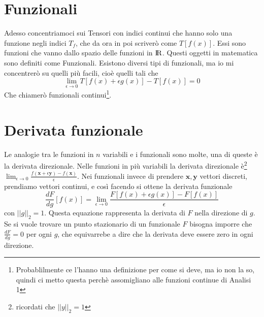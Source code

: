\documentclass[11pt,a4paper]{article}
\theoremstyle{definition}
\theoremstyle{plain}
\theoremstyle{plain}
\begin{document}
	\section{Funzionali}
		Adesso concentriamoci sui Tensori con indici continui che hanno solo una funzione negli indici $T_f$, che da ora in poi scriverò come $T[f(x)]$. Essi sono funzioni che vanno dallo spazio delle funzioni in $\rm I\!R$. Questi oggetti in matematica sono definiti come Funzionali.\newline
		Esistono diversi tipi di funzionali, ma io mi concentrerò su quelli più facili, cioè quelli tali che
		\begin{equation}
			\lim_{\epsilon 	\to 0}T[f(x)+\epsilon g(x)]-T[f(x)]=0
		\end{equation}
		Che chiamerò funzionali continui\footnote{Probablilmente ce l'hanno una definizione per come si deve, ma io non la so, quindi ci metto questa perchè assomigliano alle funzioni continue di Analisi 1}.
	\section{Derivata funzionale}
		Le analogie tra le funzioni in $n$ variabili e i funzionali sono molte, una di queste è la derivata direzionale.\newline
		Nelle funzioni in più variabili la derivata direzionale è\footnote{ricordati che $||y||_2=1$} $\lim_{\epsilon \to 0}\frac{f(\mathbf{x}+\epsilon\mathbf{y})-f(\mathbf{x})}{\epsilon}$. Nei funzionali invece di prendere $\mathbf{x},\mathbf{y}$ vettori discreti, prendiamo vettori continui, e così facendo si ottene la derivata funzionale
		\begin{equation}
			\frac{dF}{dg}[f(x)]=\lim_{\epsilon \to 0}\frac{F[f(x)+\epsilon g(x)]-F[f(x)]}{\epsilon}
		\end{equation}
		con $||g||_2=1$. Questa equazione rappresenta la derivata di $F$ nella direzione di $g$.\newline
		Se si vuole trovare un punto stazionario di un funzionale $F$ bisogna imporre che $\frac{dF}{dg}=0$ per ogni $g$, che equivarrebe a dire che la derivata deve essere zero in ogni direzione.\newline
\end{document}
